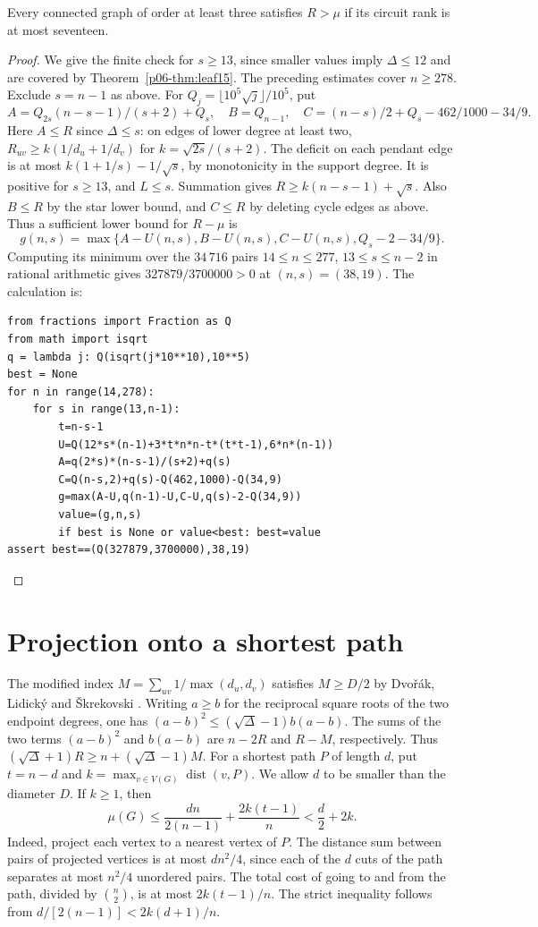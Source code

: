\documentclass[11pt,a4paper]{article}
\newcommand{\dist}{\operatorname{dist}}\newcommand{\ecc}{\operatorname{ecc}}
\begin{document}
\begin{corollary}
Every connected graph of order at least three satisfies $R>\mu$ if its circuit rank is at most
seventeen.
\end{corollary}
\begin{proof}
We give the finite check for $s\ge13$, since smaller values imply
$\Delta\le12$ and are covered by Theorem~\ref{p06-thm:leaf15}.
The preceding estimates cover $n\ge278$. Exclude $s=n-1$ as above.
For $Q_j=\lfloor 10^5\sqrt{j}\rfloor/10^5$, put
\[
 A=Q_{2s}(n-s-1)/(s+2)+Q_s,\quad
 B=Q_{n-1},\quad C=(n-s)/2+Q_s-462/1000-34/9 .
\]
Here $A\le R$ since $\Delta\le s$: on edges of lower degree at least two,
$R_{uv}\ge k(1/d_u+1/d_v)$ for $k=\sqrt{2s}/(s+2)$.
The deficit on each pendant edge is at most $k(1+1/s)-1/\sqrt{s}$,
by monotonicity in the support degree. It is positive for $s\ge13$,
and $L\le s$. Summation gives $R\ge k(n-s-1)+\sqrt{s}$.
Also $B\le R$ by the star lower bound, and $C\le R$ by deleting cycle
edges as above. Thus a sufficient lower bound for $R-\mu$ is
\[
 g(n,s)=\max\{A-U(n,s),B-U(n,s),C-U(n,s),Q_s-2-34/9\}.
\]
Computing its minimum over the $34\,716$ pairs
$14\le n\le277$, $13\le s\le n-2$ in rational arithmetic
gives $327879/3700000>0$ at $(n,s)=(38,19)$. The calculation is:
{\small
\begin{verbatim}
from fractions import Fraction as Q
from math import isqrt
q = lambda j: Q(isqrt(j*10**10),10**5)
best = None
for n in range(14,278):
    for s in range(13,n-1):
        t=n-s-1
        U=Q(12*s*(n-1)+3*t*n*n-t*(t*t-1),6*n*(n-1))
        A=q(2*s)*(n-s-1)/(s+2)+q(s)
        C=Q(n-s,2)+q(s)-Q(462,1000)-Q(34,9)
        g=max(A-U,q(n-1)-U,C-U,q(s)-2-Q(34,9))
        value=(g,n,s)
        if best is None or value<best: best=value
assert best==(Q(327879,3700000),38,19)
\end{verbatim}
}
\end{proof}

\section{Projection onto a shortest path}
The modified index $M=\sum_{uv}1/\max(d_u,d_v)$ satisfies $M\ge D/2$
by Dvo\v{r}\'ak, Lidick\'y and \v{S}krekovski \cite[Theorem~3]{p06-DLS}.
Writing $a\ge b$ for the reciprocal square roots of the two endpoint
degrees, one has $(a-b)^2\le(\sqrt{\Delta}-1)b(a-b)$. The sums of the two
terms $(a-b)^2$ and $b(a-b)$ are $n-2R$ and $R-M$, respectively.
Thus $(\sqrt{\Delta}+1)R\ge n+(\sqrt{\Delta}-1)M$.
For a shortest path $P$ of length $d$, put $t=n-d$ and
$k=\max_{v\in V(G)}\dist(v,P)$. We allow $d$ to be smaller than the
diameter $D$. If $k\ge1$, then
\begin{equation}\label{p06-eq:faj-pathprojection}
 \mu(G)\le \frac{dn}{2(n-1)}+\frac{2k(t-1)}n<\frac d2+2k.
\end{equation}
Indeed, project each vertex to a nearest vertex of $P$. The distance
sum between pairs of projected vertices is at most $dn^2/4$, since
each of the $d$ cuts of the path separates at most $n^2/4$ unordered
pairs. The total cost of going to and from the path, divided by
$\binom n2$, is at most $2k(t-1)/n$. The strict inequality follows
from $d/[2(n-1)]<2k(d+1)/n$.
\end{document}
